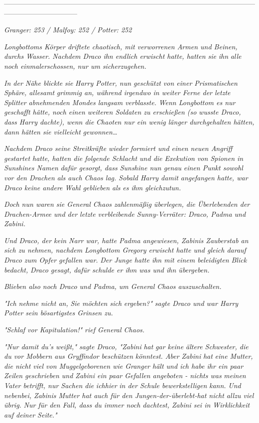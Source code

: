 {--------------------------------------------------------------------------------------------------------------------------------------------

\emph{Granger: 253 / Malfoy: 252 / Potter: 252}

\emph{Longbottoms Körper driftete chaotisch, mit verworrenen Armen und Beinen, durchs Wasser. Nachdem Draco ihn endlich erwischt hatte, hatten sie} \emph{ihn} \emph{alle} \emph{\emph{noch einmal}erschossen, nur um sicherzugehen.}

\emph{In der Nähe blickte} \emph{sie} \emph{Harry Potter, nun geschützt von einer Prismatischen Sphäre, allesamt} \emph{grimmig an, während irgendwo in weiter Ferne der letzte Splitter abnehmenden Mondes langsam verblasste.} \emph{Wenn Longbottom es nur geschafft hätte, noch einen weiteren Soldaten zu erschießen (so} \emph{wusste Draco, dass Harry dachte), wenn die} \emph{Chaoten nur ein wenig länger durchgehalten hätten, dann hätten sie vielleicht} \emph{\emph{gewonnen…}}

\emph{Nachdem Draco seine Streitkräfte wieder formiert und einen neuen Angriff gestartet hatte, hatten die folgende Schlacht und die Exekution von Spionen in} \emph{Sunshines Namen} \emph{dafür gesorgt, dass Sunshine nun genau} \emph{einen Punkt sowohl vor den Drachen als auch Chaos lag. Sobald Harry damit angefangen hatte, war Draco keine andere Wahl geblieben als} \emph{es ihm gleichzutun.}

\emph{Doch nun waren sie General Chaos zahlenmäßig überlegen, die Überlebenden der Drachen-Armee und der letzte verbleibende Sunny-Verräter: Draco, Padma und Zabini.}

\emph{Und Draco, der kein Narr war, hatte Padma angewiesen, Zabinis Zauberstab an sich zu nehmen, nachdem Longbottom Gregory erwischt hatte und gleich darauf Draco zum Opfer gefallen war.} \emph{Der Junge hatte ihn mit einem beleidigten Blick bedacht,} \emph{Draco gesagt, dafür schulde er ihm was und ihn übergeben.}

\emph{Blieben also noch Draco und Padma, um General Chaos auszuschalten.}

\emph{"Ich nehme nicht an,} \emph{Sie möchten sich} \emph{ergeben?"} \emph{sagte Draco und war Harry Potter sein bösartigstes Grinsen zu.}

\emph{"Schlaf vor Kapitulation!" rief General Chaos.}

\emph{"Nur damit du's weißt," sagte Draco, "Zabini} \emph{\emph{hat}} \emph{gar keine ältere Schwester, die du vor Mobbern aus Gryffindor} \emph{beschützen} \emph{könntest. Aber Zabini} \emph{\emph{hat}} \emph{eine Mutter, die nicht viel von Muggelgeborenen wie Granger hält und ich habe ihr ein paar} \emph{Zeilen} \emph{geschrieben und Zabini ein paar Gefallen angeboten - nichts was} \emph{meinen Vater betrifft, nur Sachen die} \emph{\emph{ich}hier} \emph{in der Schule bewerkstelligen} \emph{kann.} \emph{Und nebenbei, Zabinis Mutter hat auch für den Jungen-der-überlebt-hat nicht allzu viel übrig.} \emph{Nur für den Fall, dass du immer noch dachtest, Zabini sei in Wirklichkeit auf deiner Seite."}

}
